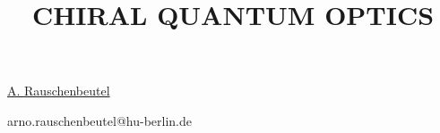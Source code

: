 \title{CHIRAL QUANTUM OPTICS}

\underline{A. Rauschenbeutel}  

\email arno.rauschenbeutel@hu-berlin.de


\vspace{\baselineskip}